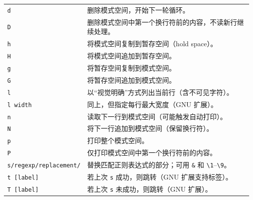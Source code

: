 \begin{table}[htbp]
\begin{tabular}{ll}
		\texttt{d}                     & 删除模式空间，开始下一轮循环。                                                                    \\
		\texttt{D}                     & 删除模式空间中第一个换行符前的内容，不读新行继续处理。                                            \\
		\texttt{h}                     & 将模式空间复制到暂存空间（hold space）。                                                          \\
		\texttt{H}                     & 将模式空间追加到暂存空间。                                                                        \\
		\texttt{g}                     & 将暂存空间复制到模式空间。                                                                        \\
		\texttt{G}                     & 将暂存空间追加到模式空间。                                                                        \\
		\texttt{l}                     & 以“视觉明确”方式列出当前行（含不可见字符）。                                                      \\
		\texttt{l width}               & 同上，但指定每行最大宽度（GNU 扩展）。                                                            \\
		\texttt{n}                     & 读取下一行到模式空间（可能触发自动打印）。                                                        \\
		\texttt{N}                     & 将下一行追加到模式空间（保留换行符）。                                                            \\
		\texttt{p}                     & 打印整个模式空间。                                                                                \\
		\texttt{P}                     & 仅打印模式空间中第一个换行符前的内容。                                                            \\
		\texttt{s/regexp/replacement/} & 替换匹配正则表达式的部分；可用 \texttt{\&} 和 \texttt{\textbackslash1}–\texttt{\textbackslash9}。 \\
		\texttt{t [label]}             & 若上次 \texttt{s} 成功，则跳转（GNU 扩展支持标签）。                                              \\
		\texttt{T [label]}             & 若上次 \texttt{s} 未成功，则跳转（GNU 扩展）。                                                    \\

\end{tabular}
\end{table}
